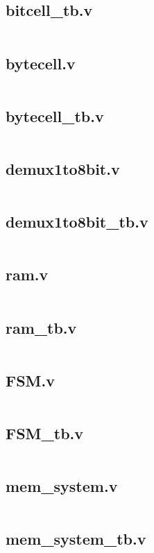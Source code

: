 \subsection*{bitcell\_tb.v}
\inputminted{verilog}{../verilog_mem8x8_m_tri_state_buffer/bitcell_tb.v}

\subsection*{bytecell.v}
\inputminted{verilog}{../verilog_mem8x8_m_tri_state_buffer/bytecell.v}

\subsection*{bytecell\_tb.v}
\inputminted{verilog}{../verilog_mem8x8_m_tri_state_buffer/bytecell_tb.v}

\subsection*{demux1to8bit.v}
\inputminted{verilog}{../verilog_mem8x8_m_tri_state_buffer/demux1to8bit.v}

\subsection*{demux1to8bit\_tb.v}
\inputminted{verilog}{../verilog_mem8x8_m_tri_state_buffer/demux1to8bit_tb.v}

\subsection*{ram.v}
\inputminted{verilog}{../verilog_mem8x8_m_tri_state_buffer/ram.v}

\subsection*{ram\_tb.v}
\inputminted{verilog}{../verilog_mem8x8_m_tri_state_buffer/ram_tb.v}

\subsection*{FSM.v}
\inputminted{verilog}{../verilog_mem8x8_m_tri_state_buffer/FSM.v}

\subsection*{FSM\_tb.v}
\inputminted{verilog}{../verilog_mem8x8_m_tri_state_buffer/FSM_tb.v}

\subsection*{mem\_system.v}
\inputminted{verilog}{../verilog_mem8x8_m_tri_state_buffer/mem_system.v}

\subsection*{mem\_system\_tb.v}
\inputminted{verilog}{../verilog_mem8x8_m_tri_state_buffer/mem_system_tb.v}

